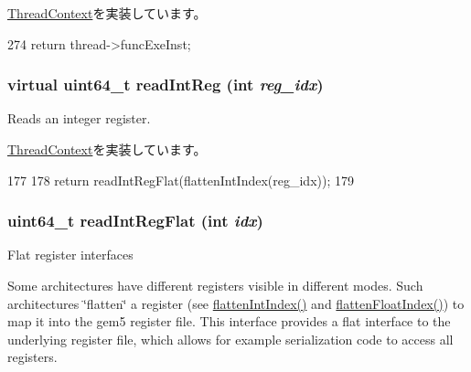 \hyperlink{classThreadContext_ae9aa32b63846c7bae5f2b6d899bdbf9c}{ThreadContext}を実装しています。


\begin{DoxyCode}
274 { return thread->funcExeInst; }
\end{DoxyCode}
\hypertarget{classO3ThreadContext_ad1e79749db6bf8c1a5037d798563cd9e}{
\subsubsection[{readIntReg}]{\setlength{\rightskip}{0pt plus 5cm}virtual uint64\_\-t readIntReg (int {\em reg\_\-idx})}}
\label{classO3ThreadContext_ad1e79749db6bf8c1a5037d798563cd9e}
Reads an integer register. 

\hyperlink{classThreadContext_af80734776d68e6acd48e22f6c999394a}{ThreadContext}を実装しています。


\begin{DoxyCode}
177                                              {
178         return readIntRegFlat(flattenIntIndex(reg_idx));
179     }
\end{DoxyCode}
\hypertarget{classO3ThreadContext_aed7abd4afcb954f8612e4ef1fe73317a}{
\subsubsection[{readIntRegFlat}]{\setlength{\rightskip}{0pt plus 5cm}uint64\_\-t readIntRegFlat (int {\em idx})}}
\label{classO3ThreadContext_aed7abd4afcb954f8612e4ef1fe73317a}
Flat register interfaces

Some architectures have different registers visible in different modes. Such architectures \char`\"{}flatten\char`\"{} a register (see \hyperlink{classO3ThreadContext_aa529f2d70520c578e3e29b3bf1a66312}{flattenIntIndex()} and \hyperlink{classO3ThreadContext_ab9ea3f8f1a21df875c7273c7377dfac1}{flattenFloatIndex()}) to map it into the gem5 register file. This interface provides a flat interface to the underlying register file, which allows for example serialization code to access all registers. 

